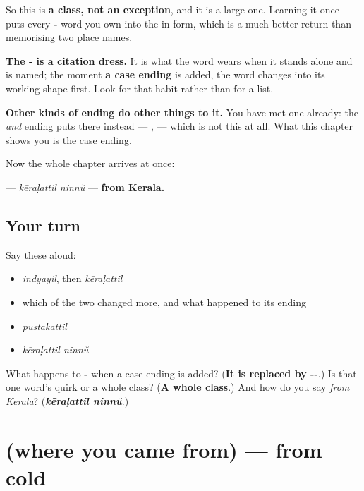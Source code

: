 \begin{grammarlens}[title={Grammar Lens: two of your place names behave differently}]
So this is \textbf{a class, not an exception}, and it is a large one. Learning it once puts every \textbf{-} word you own into the in-form, which is a much better return than memorising two place names.

\textbf{The - is a citation dress.} It is what the word wears when it stands alone and is named; the moment \textbf{a case ending} is added, the word changes into its working shape first. Look for that habit rather than for a list.

\textbf{Other kinds of ending do other things to it.} You have met one already: the \emph{and} ending puts \textbf{} there instead — \textbf{}, \textbf{} — which is not this at all. What this chapter shows you is the case ending.

Now the whole chapter arrives at once:

\textbf{ } — \emph{kēraḷattil ninnŭ} — \textbf{from Kerala.}
\end{grammarlens}

\subsection*{Your turn}
Say these aloud:

\begin{itemize}
\raggedright
  \item \emph{indyayil}, then \emph{kēraḷattil}
  \item which of the two changed more, and what happened to its ending
  \item \emph{pustakattil}
  \item \emph{kēraḷattil ninnŭ}
\end{itemize}

\begin{tcolorbox}[breakable,colback=teal!4,colframe=teal!35!black,title={Before you move on}]
What happens to \textbf{-} when a case ending is added? (\textbf{It is replaced by --}.) Is that one word's quirk or a whole class? (\textbf{A whole class}.) And how do you say \emph{from Kerala}? (\emph{\textbf{kēraḷattil ninnŭ}}.)
\end{tcolorbox}
\section[(where you came from)]{(where you came from) — from cold}

\label{lesson:ML-R83-from-recall}



